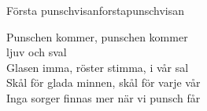 \begin{song}{Första punschvisan}{forstapunschvisan}
\begin{vers}
Punschen kommer, punschen kommer\\
ljuv och sval\\
Glasen imma, röster stimma, i vår sal\\
Skål för glada minnen, skål för varje vår\\
Inga sorger finnas mer när vi punsch får\\
\end{vers}
\end{song}
